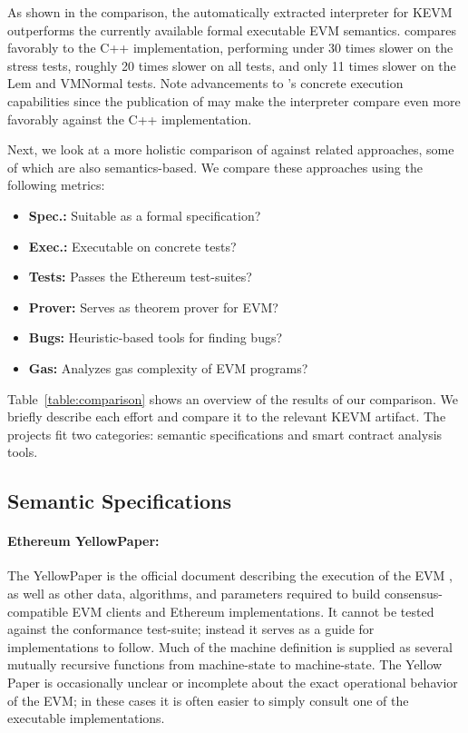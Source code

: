 As shown in the comparison,
   the automatically extracted interpreter for KEVM outperforms
   the currently available formal executable EVM semantics.
\KEVM{} compares favorably to the C++ implementation,
     performing under 30 times slower on the stress tests,
     roughly 20 times slower on all tests, and
     only 11 times slower on the Lem and VMNormal tests. Note
     advancements to \K's concrete execution capabilities since
     the publication of \cite{HildenbrandtCSF18} may
     make the \KEVM{} interpreter compare even more favorably against the
     C++ implementation.

Next, we look at a more holistic comparison of \KEVM{} against related approaches,
some of which are also semantics-based. We compare these approaches using the
following metrics:
\begin{itemize}
    \item \textbf{Spec.:} Suitable as a formal specification?
    \item \textbf{Exec.:} Executable on concrete tests?
    \item \textbf{Tests:} Passes the Ethereum test-suites?
    \item \textbf{Prover:} Serves as theorem prover for EVM?
    \item \textbf{Bugs:} Heuristic-based tools for finding bugs?
    \item \textbf{Gas:} Analyzes gas complexity of EVM programs?
\end{itemize}

Table~\ref{table:comparison} shows an overview of the results of our comparison.
We briefly describe each effort and compare it to the relevant KEVM artifact.
The projects fit two categories: semantic specifications and smart contract analysis tools.


\subsection{Semantic Specifications}

\paragraph{Ethereum YellowPaper:}
The YellowPaper is the official document describing the execution of the EVM
\cite{WoodReport14},
    as well as other data, algorithms,
    and parameters required to build consensus-compatible
    EVM clients and Ethereum implementations.
It cannot be tested against the conformance test-suite;
instead it serves as a guide for implementations to follow.
Much of the machine definition is supplied as several mutually
recursive functions from machine-state to machine-state.
The Yellow Paper is occasionally unclear or incomplete about
the exact operational behavior of the EVM;
in these cases it is often easier to simply consult one of the executable implementations.


